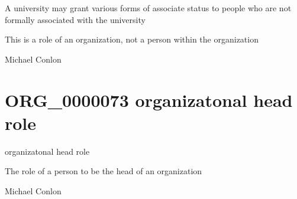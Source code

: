 \documentclass[letterpaper,10pt,english]{sphinxmanual}
\begin{document}
\begin{sphinxShadowBox}

\sphinxAtStartPar
A university may grant various forms of associate status to people who are not formally associated with the university
\end{sphinxShadowBox}

\begin{sphinxShadowBox}

\sphinxAtStartPar
This is a role of an organization, not a person within the organization
\end{sphinxShadowBox}

\begin{sphinxShadowBox}

\sphinxAtStartPar
Michael Conlon 
\end{sphinxShadowBox}
\begin{quote}
\label{\detokenize{doc-ORG_0000073:org-0000073}}\label{\detokenize{doc-ORG_0000073:organizatonal-head-role}}\label{\detokenize{doc-ORG_0000073:org-0000073}}
\ignorespaces \end{quote}


\section{ORG\_0000073 \sphinxhyphen{} organizatonal head role}
\label{\detokenize{doc-ORG_0000073:org-0000073-organizatonal-head-role}}\label{\detokenize{doc-ORG_0000073:index-0}}\label{\detokenize{doc-ORG_0000073::doc}}
\begin{sphinxShadowBox}

\sphinxAtStartPar
organizatonal head role
\end{sphinxShadowBox}

\begin{sphinxShadowBox}

\sphinxAtStartPar
The role of a person to be the head of an organization
\end{sphinxShadowBox}

\begin{sphinxShadowBox}

\sphinxAtStartPar
Michael Conlon 
\end{sphinxShadowBox}
\end{document}
